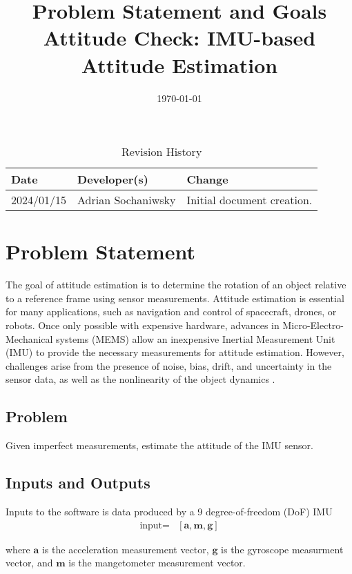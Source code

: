 \documentclass{article}
\title{Problem Statement and Goals \\ Attitude Check: IMU-based Attitude Estimation}
\author{\authname}
\date{\today}
\begin{document}
\maketitle

\begin{table}[hp]
\caption{Revision History} \label{TblRevisionHistory}
\begin{tabularx}{\textwidth}{llX}
\toprule
\textbf{Date} & \textbf{Developer(s)} & \textbf{Change}\\
\midrule
2024/01/15 & Adrian Sochaniwsky & Initial document creation.\\
\bottomrule
\end{tabularx}
\end{table}

\section{Problem Statement}

The goal of attitude estimation is to determine the rotation of an object relative to a reference
frame using sensor measurements. Attitude estimation is essential for many applications, such as
navigation and control of spacecraft, drones, or robots. Once only possible with expensive hardware,
advances in Micro-Electro-Mechanical systems (MEMS) allow an inexpensive Inertial Measurement Unit
(IMU) to provide the necessary measurements for attitude estimation. However, challenges arise from
the presence of noise, bias, drift, and uncertainty in the sensor data, as well as the nonlinearity
of the object dynamics \cite{statement}.

\subsection{Problem}

Given imperfect measurements, estimate the attitude of the IMU sensor.

\subsection{Inputs and Outputs}

Inputs to the software is data produced by a 9 degree-of-freedom (DoF) IMU
\begin{align*}
    \text{input} =& [\mathbf{a}, \mathbf{m}, \mathbf{g}]
\end{align*}

where $\mathbf{a}$ is the acceleration measurement vector, $\mathbf{g}$ is the gyroscope measurment vector, and $\mathbf{m}$ is the mangetometer measurement vector.
\end{document}
